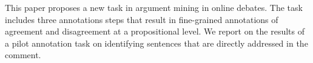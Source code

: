 This paper proposes a new task in argument mining in online debates. The task includes three annotations steps that result in fine-grained annotations of agreement and disagreement at a propositional level. We report on the results of a pilot annotation task on identifying sentences that are directly addressed in the comment.
